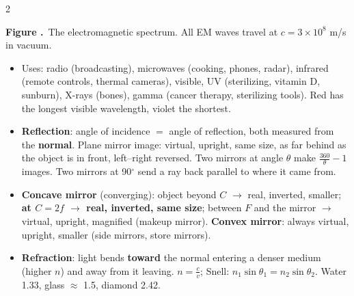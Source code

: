 \documentclass[10pt]{article}
\makeatletter
\newcommand{\sub}[1]{\par\vspace{2.5pt}{\sffamily\bfseries\color{dblue}#1}\par\nobreak\vspace{0.5pt}\@afterheading}
\newcommand{\term}[1]{\textbf{\color{dnavy}#1}}
\newcounter{fig}
\newcommand{\figcap}[1]{\refstepcounter{fig}\par\vspace{1pt}
  {\centering\scriptsize\sffamily\textcolor{dblue}{\textbf{Figure \thefig.}}\ #1\par}\vspace{2pt}}
\makeatother
\begin{document}
\begin{multicols}{2}
\sub{G. Light and optics}
\begin{center}
\figcap{The electromagnetic spectrum. All EM waves travel at $c=3\times10^8$ m/s in vacuum.}
\end{center}
\begin{itemize}
\item Uses: radio (broadcasting), microwaves (cooking, phones, radar), infrared (remote controls, thermal cameras), visible, UV (sterilizing, vitamin D, sunburn), X-rays (bones), gamma (cancer therapy, sterilizing tools). Red has the longest visible wavelength, violet the shortest.
\item \term{Reflection}: angle of incidence $=$ angle of reflection, both measured from the \textbf{normal}. Plane mirror image: virtual, upright, same size, as far behind as the object is in front, left--right reversed. Two mirrors at angle $\theta$ make $\frac{360}{\theta}-1$ images. Two mirrors at 90$^\circ$ send a ray back parallel to where it came from.
\item \term{Concave mirror} (converging): object beyond $C$ $\to$ real, inverted, smaller; \textbf{at $C=2f$ $\to$ real, inverted, same size}; between $F$ and the mirror $\to$ virtual, upright, magnified (makeup mirror). \term{Convex mirror}: always virtual, upright, smaller (side mirrors, store mirrors).
\item \term{Refraction}: light bends \textbf{toward} the normal entering a denser medium (higher $n$) and away from it leaving. $n=\frac cv$; Snell: $n_1\sin\theta_1=n_2\sin\theta_2$. Water 1.33, glass $\approx$ 1.5, diamond 2.42.

\end{itemize}
\end{multicols}
\end{document}

